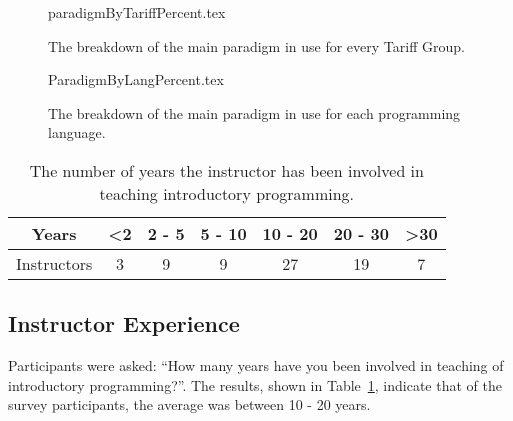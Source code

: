 \documentclass{sig-alternate}
\begin{document}
\begin{figure}\vskip-12pt
\begin{center}
{paradigmByTariffPercent.tex}
\end{center}\vskip-18pt
\caption{The breakdown of the main paradigm in use for every Tariff Group.}
\end{figure}

%


\begin{figure}
\begin{center}
{ParadigmByLangPercent.tex}
\end{center}\vskip-18pt
\caption{The breakdown of the main paradigm in use for each programming language.}
\end{figure}


\begin{table}[h]
\centering
\caption{The number of years the instructor has been involved in teaching introductory programming.}
\label{tab:yearsTeaching}
\begin{tabular}{ccccccc}
\hline
Years       & \textless 2 & 2 - 5 & 5 - 10 & 10 - 20 & 20 - 30 & \textgreater 30 \\ \hline
Instructors & 3          & 9     & 9      & 27      & 19      & 7              \\ \hline
\end{tabular}
\end{table}

\subsection{Instructor Experience}

Participants were asked: ``How many years have you been involved in
teaching of introductory programming?''. The results, shown in
Table~\ref{tab:yearsTeaching}, indicate that of the survey
participants, the average was between 10 - 20 years.
\end{document}
